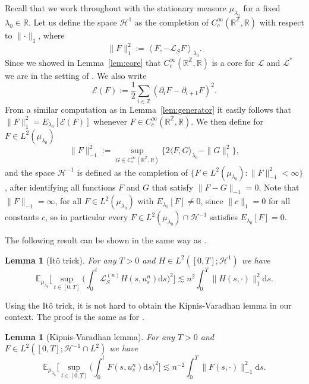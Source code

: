 \documentclass[11pt, a4paper]{article}
\newcommand{\assign}{:=}
\newcommand{\cdummy}{\cdot}
\newcommand{\mathd}{\mathrm{d}}
\newtheorem{lemma}[theorem]{Lemma}
\newcommand{\CH}{\mathscr{H}}
\newcommand{\CE}{\mathscr{E}}
\newcommand{\CL}{\mathcal{L}}
\newcommand{\1}{\mathbf{1}}
\begin{document}
Recall that we work throughout with the stationary measure
${\mu}_{\lambda_0}$ for a fixed $\lambda_0 \in \mathbb{R}$. Let us define
the space $\CH^1$ as the completion of $C^{\infty}_c
(\mathbb{R}^{\mathbb{Z}}, \mathbb{R})$ with respect to $\lVert \cdot \rVert_1$,
where
\[ \| F \|_1^2 \assign \left\langle F, - \CL_S F \right\rangle_{\lambda_0} .
\]
Since we showed in Lemma~\ref{lem:core} that $C^{\infty}_c
(\mathbb{R}^{\mathbb{Z}}, \mathbb{R})$ is a core for $\CL$ and $\CL^{\ast}$
we are in the setting of
\cite[Section~2.2]{bib:komorowskiLandimOlla}. We
also write
\[
  \CE (F) \assign  \frac{1}{2} \sum_{i \in \mathbb{Z}} (\partial_i F -
  \partial_{i + 1} F)^2 .
\]
From a similar computation as in Lemma~\ref{lem:generator} it easily follows
that $\| F \|_1^2 = E_{\lambda_0} \left[ \CE (F) \right]$ whenever $F \in
C^{\infty}_c (\mathbb{R}^{\mathbb{Z}}, \mathbb{R})$. We then define for $F \in L^2 ({\mu}_{\lambda_0})$
\[ \| F \|_{- 1}^2 \assign \sup_{G \in C^{\infty}_c
   (\mathbb{R}^{\mathbb{Z}}, \mathbb{R})} \{ 2 \langle F, G
   \rangle_{\lambda_0} - \| G \|_1^2 \}, \]
and the space $\CH^{- 1}$ is defined as the completion of $\{ F \in L^2
({\mu}_{\lambda_0}) : \| F \|_{- 1}^2 < \infty \}$, after identifying all
functions $F$ and $G$ that satisfy $\| F - G \|_{- 1} = 0$. Note that $\| F
\|_{- 1} = \infty$, for all $F \in L^2 ({\mu}_{\lambda_0})$ with
$E_{\lambda_0} [F] \neq 0$, since $\| c \|_1 = 0$ for all constants $c$, so in
particular every $F \in L^2 ({\mu}_{\lambda_0}) \cap \CH^{- 1}$ satisfies
$E_{\lambda_0} [F] = 0$.

The following result can be shown in the same way as \cite[Lemma~2]{bib:gubinelliJara}.

\begin{lemma}[It{\^o} trick]
  For any $T > 0$ and $H \in L^2([0,T]; \CH^{1})$ we
  have
  \[
     \mathbb{E}_{{\mu}_{\lambda_0}} \Big[ \sup_{t \in [0, T]} \Big(\int_0^t \CL^{(n)}_S H (s, u^n_s) \mathd s \Big)^2 \Big] \lesssim n^2 \int_0^T \| H (s, \cdummy) \|_1^2 \mathd s.
  \]
\end{lemma}

Using the It{\^o} trick, it is not hard to obtain the Kipnis-Varadhan lemma in
our context. The proof is the same as for \cite[Lemma~2]{bib:energyUniqueness}.


\begin{lemma}[Kipnis-Varadhan lemma]
  \label{lem:Kipnis-Varadhan}
  For any $T > 0$ and $F \in L^2( [0, T]; \CH^{- 1} \cap L^2)$ we have
  \[ \mathbb{E}_{{\mu}_{\lambda_0}} \Big[ \sup_{t \in [0, T]} \Big(
     \int_0^t F (s, u^n_s) \mathd s \Big)^2 \Big] \lesssim n^{- 2}
     \int_0^T \| F (s, \cdummy) \|_{- 1}^2 \mathd s. \]
\end{lemma}
\end{document}
